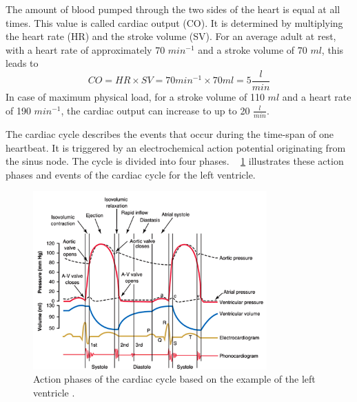  The amount of blood pumped through the two sides of the heart is equal at all times. This value is called cardiac output (CO). It is determined by multiplying the heart rate (HR) and the stroke volume (SV). For an average adult at rest, with a heart rate of approximately 70 $min^{-1}$ and a stroke volume of 70 $ml$, this leads to
 \begin{equation}
   CO = HR \times SV = 70 min^{-1} \times 70 ml = 5 \frac{l}{min}
  \label{eq:CO}
 \end{equation}
In case of maximum physical load, for a stroke volume of 110 $ml$ and a heart rate of 190 $min^{-1}$,  the cardiac output can increase to up to 20 $\frac{l}{min}$. \cite{HKS4}

The cardiac cycle describes the events that occur during the time-span of one heartbeat. It is triggered by an electrochemical action potential originating from the sinus node. The cycle is divided into four phases. \figurename~ \ref{fig:cardiac_cycle} illustrates these action phases and events of the cardiac cycle for the left ventricle.
\begin{figure}[h]
  \centering
  \includegraphics[width=0.8\textwidth]{images/cardiac_cycle.jpg}
  \caption[Action phases of left ventricular cardiac cycle]{Action phases of the cardiac cycle based on the example of the left ventricle \cite{GH20}.}
  \label{fig:cardiac_cycle}
\end{figure}
